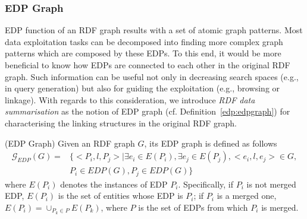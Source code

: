 \subsubsection{EDP Graph}
EDP function of an RDF graph results with a set of atomic graph patterns. Most data exploitation tasks can be decomposed into finding more complex graph patterns which are composed by these EDPs. To this end, it would be more beneficial to know how EDPs are connected to each other in the original RDF graph. Such information can be useful not only in decreasing search spaces (e.g., in query generation) but also for guiding the exploitation (e.g., browsing or linkage). With regards to this consideration, we introduce \emph{RDF data summarisation} as the notion of EDP graph (cf. Definition~\ref{edp:edpgraph}) for characterising the linking structures in the original RDF graph.
\vspace{-1ex}
\begin{definition} 
\label{edp:edpgraph} (EDP Graph) Given an RDF graph $G$, its EDP graph is defined as follows
\begin{equation}
\begin{split}
\mathcal{G}_{EDP}(G)= & 
\{<P_i,l,P_j>|\exists e_i \in E(P_i ), \exists e_j \in E(P_j ),<e_i,l,e_j> \in G, \\ 
& P_i \in EDP(G),P_j \in EDP(G) \}
\end{split}
\end{equation}
where $E(P_i)$ denotes the instances of EDP $P_i$. Specifically, if $P_i$ is not merged EDP, $E(P_i)$ is the set of entities whose EDP is $P_i$; if $P_i$  is a merged one, $E(P_i )=\cup_{P_k \in P}{E(P_k)}$, where $P$ is the set of EDPs from which $P_i$  is merged.
\end{definition}
